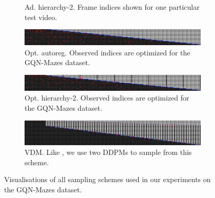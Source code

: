 \begin{figure}[t]
\begin{subfigure}[t]{\textwidth}
        \caption{Ad. hierarchy-2. Frame indices shown for one particular test video.}
    \end{subfigure}
    \begin{subfigure}[t]{\textwidth}
        \includegraphics[width=\textwidth]{figs/fdm/inference-modes/sample_vis_autoreg_optimal-linspace-t-force-nearby_T=300_sampling_10_out_of_20_red_blue_flipped.png}
        \caption{Opt. autoreg. Observed indices are optimized for the GQN-Mazes dataset.} \label{fig:fdm-opt-autoreg}
    \end{subfigure}
    \begin{subfigure}[t]{\textwidth}
        \includegraphics[width=\textwidth]{figs/fdm/inference-modes/sample_vis_hierarchy-2_optimal-linspace-t-force-nearby_T=300_sampling_10_out_of_20_red_blue_flipped.png}
        \caption{Opt. hierarchy-2. Observed indices are optimized for the GQN-Mazes dataset.} \label{fig:fdm-opt-hierarchy-2}
    \end{subfigure}
    \begin{subfigure}[t]{\textwidth}
        \includegraphics[width=\textwidth]{figs/fdm/inference-modes/sample_vis_google_T=300_sampling_None_out_of_None_red_blue_flipped.png}
        \caption{VDM. Like \citet{ho2022video}, we use two DDPMs to sample from this scheme.}
    \end{subfigure}
    \caption{Visualisations of all sampling schemes used in our experiments on the GQN-Mazes dataset.}
    \label{fig:fdm-sampling-schemes}
\end{figure}


